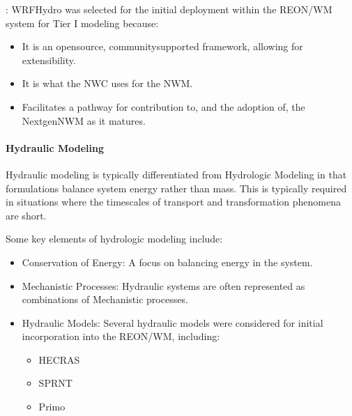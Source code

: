 \documentclass[letterpaper,12pt,english]{book}
\begin{document}
\sphinxAtStartPar
{}: WRF\sphinxhyphen{}Hydro was selected for the initial deployment within the REON/WM system for Tier I modeling because:
\begin{itemize}
\item {} 
\sphinxAtStartPar
It is an open\sphinxhyphen{}source, community\sphinxhyphen{}supported framework, allowing for extensibility.

\item {} 
\sphinxAtStartPar
It is what the NWC uses for the NWM.

\item {} 
\sphinxAtStartPar
Facilitates a pathway for contribution to, and the adoption of, the Nextgen\sphinxhyphen{}NWM as it matures.

\end{itemize}

\paragraph{Hydraulic Modeling}
\label{\detokenize{requirements/knowledge/hydraulic:hydraulic-modeling}}\label{\detokenize{requirements/knowledge/hydraulic::doc}}
\sphinxAtStartPar
Hydraulic modeling is typically differentiated from Hydrologic Modeling in that formulations balance system energy rather than mass. This is typically required in situations where the timescales of transport and transformation phenomena are short.

\sphinxAtStartPar
Some key elements of hydrologic modeling include:
\begin{itemize}
\item {} 
\sphinxAtStartPar
Conservation of Energy: A focus on balancing energy in the system.

\item {} 
\sphinxAtStartPar
Mechanistic Processes: Hydraulic systems are often represented as combinations of Mechanistic processes.

\item {} 
\sphinxAtStartPar
Hydraulic Models: Several hydraulic models were considered for initial incorporation into the REON/WM, including:
\begin{itemize}
\item {} 
\sphinxAtStartPar
HEC\sphinxhyphen{}RAS

\item {} 
\sphinxAtStartPar
SPRNT

\item {} 
\sphinxAtStartPar
Primo

\end{itemize}

\end{itemize}
\end{document}
